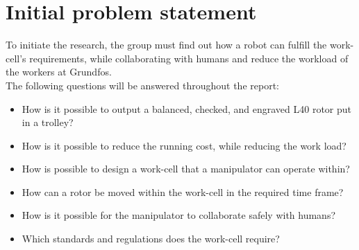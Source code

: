 \section{Initial problem statement}\label{ch:Initial problem statment}


To initiate the research, the group must find out how a robot can fulfill the work-cell's requirements, while collaborating with humans and reduce the workload of the workers at Grundfos.\\
The following questions will be answered throughout the report:

\begin{itemize}

    \item How is it possible to output a balanced, checked, and engraved L40 rotor put in a trolley?
    \item How is it possible to reduce the running cost, while reducing the work load?
    \item How is possible to design a work-cell that a manipulator can operate within?
    \item How can a rotor be moved within the work-cell in the required time frame?
    \item How is it possible for the manipulator to collaborate safely with humans?
    \item Which standards and regulations does the work-cell require?
\end{itemize}

